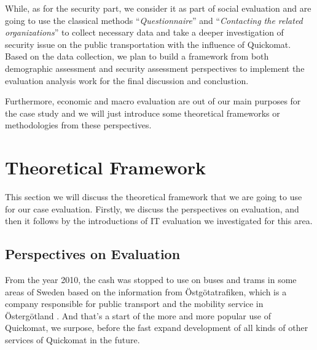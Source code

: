\documentclass[twocolumn]{article}
\begin{document}
While, as for the security part, we consider it as part of social evaluation and are going to use the classical methods “\emph{Questionnaire}” and “\emph{Contacting the related organizations}” to collect necessary data and take a deeper investigation of security issue on the public transportation with the influence of Quickomat. Based on the data collection, we plan to build a framework from both demographic assessment and security assessment perspectives to implement the evaluation analysis work for the final discussion and conclustion. 

Furthermore, economic and macro evaluation are out of our main purposes for the case study and we will just introduce some theoretical frameworks or methodologies from these perspectives.

\section{Theoretical Framework}
This section we will discuss the theoretical framework that we are going to use for our case evaluation. Firstly, we discuss the perspectives on evaluation, and then it follows by the introductions of IT evaluation we investigated for this area.

\subsection{Perspectives on Evaluation}
From the year 2010, the cash was stopped to use on buses and trams in some areas of Sweden based on the information from Östgötatrafiken, which is a company responsible for public transport and the mobility service in Östergötland \citep{Bjorsaters2009}. And that’s a start of the more and more popular use of Quickomat, we surpose, before the fast expand development of all kinds of other services of Quickomat in the future. 
\end{document}
